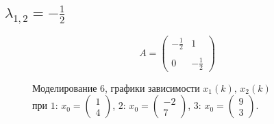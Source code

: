 \documentclass[a5paper, 10pt]{article}
\theoremstyle{definition}
\theoremstyle{plain}
\theoremstyle{remark}
\begin{document}
\subsection{$\lambda_{1, 2} = -\frac{1}{2}$}
\begin{equation}
A =
\begin{pmatrix}
 -\frac{1}{2} &  1\\
\\
0 &  -\frac{1}{2}
\end{pmatrix}
\end{equation}
\begin{figure}[h!]
\caption{Моделирование 6, графики зависимости $x_1 \left( k \right), \, x_2 \left( k \right)$ \\ при  $1: \, x_0 = \begin{pmatrix} 1 \\ 4 \end{pmatrix}$, $2: \, x_0 = \begin{pmatrix} -2 \\ 7 \end{pmatrix}$, $3: \, x_0 = \begin{pmatrix} 9 \\ 3 \end{pmatrix}$.}
\end{figure}


\end{document}
